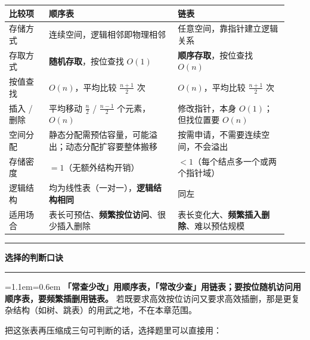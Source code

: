 \documentclass[11pt,openany,UTF8]{ctexbook}
\newcommand{\callouthead}[2]{%
  \par\addvspace{7pt}\noindent
  {\color{#1}\rule[-0.15em]{3pt}{1.05em}}\hspace{0.5em}%
  {\bfseries\color{#1}#2}\par\nobreak\vspace{-0.35em}%
  {\color{rulesep}\hrule height 0.4pt}\nobreak\vspace{0.45em}%
  \begingroup\small\setlength{\parindent}{0pt}%
  \leftskip=1.1em\rightskip=0.6em\noindent\ignorespaces}
\newcommand{\calloutend}{\par\endgroup\addvspace{7pt}}
\newenvironment{callkey}[1]{\callouthead{keybar}{#1}}{\calloutend}
\begin{document}
\begingroup\small\setlength{\tabcolsep}{4.0pt}
\begin{longtable}{@{}L{0.1362\linewidth}L{0.4266\linewidth}L{0.3657\linewidth}@{}}
\toprule
\textbf{比较项} & \textbf{顺序表} & \textbf{链表} \\
\midrule
\endhead
存储方式 & 连续空间，逻辑相邻即物理相邻 & 任意空间，靠指针建立逻辑关系 \\
存取方式 & \textbf{随机存取}，按位查找 $O(1)$ & \textbf{顺序存取}，按位查找 $O(n)$ \\
按值查找 & $O(n)$，平均比较 $\frac{n+1}{2}$ 次 & $O(n)$，平均比较 $\frac{n+1}{2}$ 次 \\
插入 / 删除 & 平均移动 $\frac{n}{2}$ / $\frac{n-1}{2}$ 个元素，$O(n)$ & 修改指针，本身 $O(1)$；但找位置要 $O(n)$ \\
空间分配 & 静态分配需预估容量，可能溢出；动态分配扩容要整体搬移 & 按需申请，不需要连续空间，不会溢出 \\
存储密度 & $=1$（无额外结构开销） & $<1$（每个结点多一个或两个指针域） \\
逻辑结构 & 均为线性表（一对一），\textbf{逻辑结构相同} & 同左 \\
适用场合 & 表长可预估、\textbf{频繁按位访问}、很少插入删除 & 表长变化大、\textbf{频繁插入删除}、难以预估规模 \\
\bottomrule
\end{longtable}
\endgroup

\begin{callkey}{选择的判断口诀}
\textbf{「常查少改」用顺序表，「常改少查」用链表；要按位随机访问用顺序表，要频繁插删用链表。} 若既要求高效按位访问又要求高效插删，那是更复杂结构（如树、跳表）的用武之地，不在本章范围。

\end{callkey}

把这张表再压缩成三句可判断的话，选择题里可以直接用：
\end{document}
